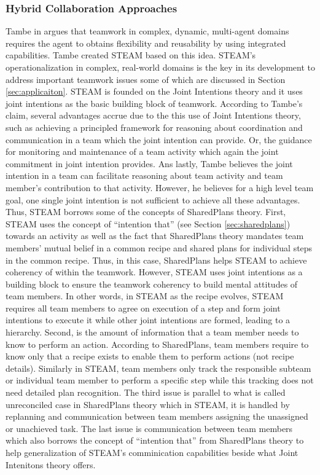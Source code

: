 \documentclass[11pt]{article}
\begin{document}
\subsubsection{Hybrid Collaboration Approaches}

Tambe in \cite{tambe:flexible-teamwork} argues that teamwork in complex,
dynamic, multi-agent domains requires the agent to obtains flexibility and
reusability by using integrated capabilities. Tambe created STEAM based on this
idea. STEAM's operationalization in complex, real-world domains is the key in
its development to address important teamwork issues some of which are discussed
in Section \ref{sec:applicaiton}. STEAM is founded on the Joint Intentions
theory and it uses joint intentions as the basic building block of teamwork.
According to Tambe's claim, several advantages accrue due to the this use of
Joint Intentions theory, such as achieving a principled framework for reasoning
about coordination and communication in a team which the joint intention can
provide. Or, the guidance for monitoring and maintenance of a team activity
which again the joint commitment in joint intention provides. Ans lastly, Tambe
believes the joint intention in a team can facilitate reasoning about team
activity and team member's contribution to that activity. However, he believes
for a high level team goal, one single joint intention is not sufficient to
achieve all these advantages. Thus, STEAM borrows some of the concepts of
SharedPlans theory. First, STEAM uses the concept of ``intention that'' (see
Section \ref{sec:sharedplans}) towards an activity as well as the fact that
SharedPlans theory mandates team members' mutual belief in a common recipe and
shared plans for individual steps in the common recipe. Thus, in this case,
SharedPlans helps STEAM to achieve coherency of within the teamwork. However,
STEAM uses joint intentions as a building block to ensure the teamwork coherency
to build mental attitudes of team members. In other words, in STEAM as the
recipe evolves, STEAM requires all team members to agree on execution of a step
and form joint intentions to execute it while other joint intentions are formed,
leading to a hierarchy. Second, is the amount of information that a team member
needs to know to perform an action. According to SharedPlans, team members
require to know only that a recipe exists to enable them to perform actions
(not recipe details). Similarly in STEAM, team members only track the
responsible subteam or individual team member to perform a specific step while
this tracking does not need detailed plan recognition. The third issue is
parallel to what is called unreconciled case in SharedPlans theory which in
STEAM, it is handled by replanning and communication between team members
assigning the unassigned or unachieved task. The last issue is communication
between team members which also borrows the concept of ``intention that'' from
SharedPlans theory to help generalization of STEAM's comminication capabilities 
beside what Joint Intenitons theory offers.
\end{document}
